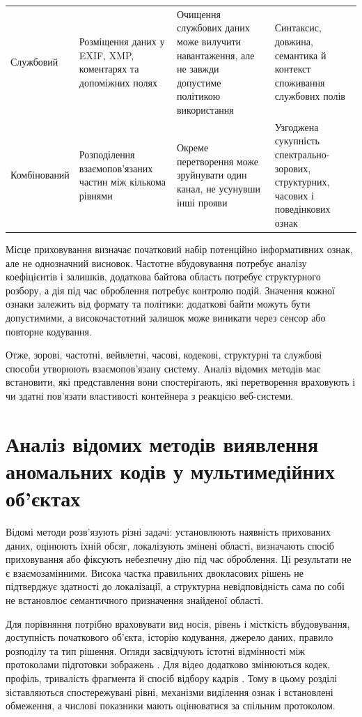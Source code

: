 \begin{table}[H]
\begin{tabularx}{\textwidth}{>{\raggedright\arraybackslash}p{}>{\raggedright\arraybackslash}p{}YY}
Службовий & Розміщення даних у EXIF, XMP, коментарях та допоміжних полях & Очищення службових даних може вилучити навантаження, але не завжди допустиме політикою використання & Синтаксис, довжина, семантика й контекст споживання службових полів \\
Комбінований & Розподілення взаємопов’язаних частин між кількома рівнями & Окреме перетворення може зруйнувати один канал, не усунувши інші прояви & Узгоджена сукупність спектрально-зорових, структурних, часових і поведінкових ознак \\
\bottomrule
\end{tabularx}
\end{table}

Місце приховування визначає початковий набір потенційно інформативних ознак, але не однозначний висновок. Частотне вбудовування потребує аналізу коефіцієнтів і залишків, додаткова байтова область потребує структурного розбору, а дія під час оброблення потребує контролю подій. Значення кожної ознаки залежить від формату та політики: додаткові байти можуть бути допустимими, а високочастотний залишок може виникати через сенсор або повторне кодування.

Отже, зорові, частотні, вейвлетні, часові, кодекові, структурні та службові способи утворюють взаємопов’язану систему. Аналіз відомих методів має встановити, які представлення вони спостерігають, які перетворення враховують і чи здатні пов’язати властивості контейнера з реакцією веб-системи.

\section{Аналіз відомих методів виявлення аномальних кодів у мультимедійних об’єктах}
\label{sec:detection_methods_analysis}

Відомі методи розв’язують різні задачі: установлюють наявність прихованих даних, оцінюють їхній обсяг, локалізують змінені області, визначають спосіб приховування або фіксують небезпечну дію під час оброблення. Ці результати не є взаємозамінними. Висока частка правильних двокласових рішень не підтверджує здатності до локалізації, а структурна невідповідність сама по собі не встановлює семантичного призначення знайденої області.

Для порівняння потрібно враховувати вид носія, рівень і місткість вбудовування, доступність початкового об’єкта, історію кодування, джерело даних, правило розподілу та тип рішення. Огляди засвідчують істотні відмінності між протоколами підготовки зображень \cite{muralidharan2022race,kheddar2024review}. Для відео додатково змінюються кодек, профіль, тривалість фрагмента й спосіб відбору кадрів \cite{bouzegza2022video}. Тому в цьому розділі зіставляються спостережувані рівні, механізми виділення ознак і встановлені обмеження, а числові показники мають оцінюватися за спільним протоколом.

